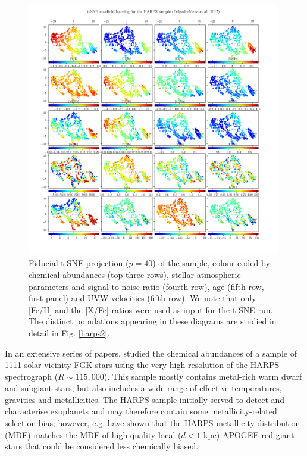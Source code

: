 \documentclass{aa}  %
\begin{document}
\begin{figure}\centering
 \includegraphics[width=0.99\textwidth]{im/HARPS_tsne_plots_withteffcut40_rand0.png}
\caption{Fiducial t-SNE projection ($p=40$) of the \citet{DelgadoMena2017} sample, colour-coded by chemical abundances (top three rows), stellar atmospheric parameters and signal-to-noise ratio (fourth row), age (fifth row, first panel) and UVW velocities (fifth row). We note that only [Fe/H] and the [X/Fe] ratios were used as input for the t-SNE run. The distinct populations appearing in these diagrams are studied in detail in Fig. \ref{harps2}.}
\label{harps1}
\end{figure}

In an extensive series of papers, \citet{Adibekyan2011, Adibekyan2012, DelgadoMena2014, DelgadoMena2015, BertrandeLis2015, Suarez-Andres2017, DelgadoMena2017, DelgadoMena2017a} studied the chemical abundances of a sample of 1111 solar-vicinity FGK stars using the very high resolution of the HARPS spectrograph ($R\sim 115,000$). This sample mostly contains metal-rich warm dwarf and subgiant stars, but also includes a wide range of effective temperatures, gravities and metallicities. The HARPS sample initially served to detect and characterise exoplanets and may therefore contain some metallicity-related selection bias; however, e.g. \citet{Anders2014} have shown that the HARPS metallicity distribution (MDF) matches the MDF of high-quality local ($d<1$ kpc) APOGEE red-giant stars that could be considered less chemically biased. 
\end{document}
